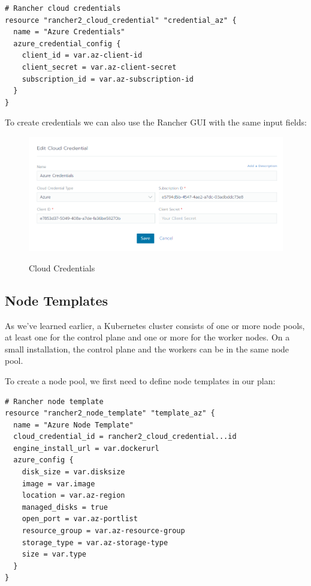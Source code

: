 \begin{lstlisting}[caption=Cloud Credentials, frame=single, basicstyle=\ttfamily]
# Rancher cloud credentials
resource "rancher2_cloud_credential" "credential_az" {
  name = "Azure Credentials"
  azure_credential_config {
    client_id = var.az-client-id
    client_secret = var.az-client-secret
    subscription_id = var.az-subscription-id
  }
}
\end{lstlisting}

To create credentials we can also use the Rancher GUI with the same input fields:

\begin{figure}[H]
\centering
\caption {Cloud Credentials}
\includegraphics[width=\linewidth]{images/cloud-credentials.png}
\label{fig:cloudCredentials}
\end{figure}

\subsection{Node Templates}

As we've learned earlier, a Kubernetes cluster consists of one or more node pools, at least one for the control plane and one or more for the worker nodes. On a small installation, the control plane and the workers can be in the same node pool.

To create a node pool, we first need to define node templates in our plan:

\begin{lstlisting}[caption=Node Template, frame=single, basicstyle=\ttfamily]
# Rancher node template
resource "rancher2_node_template" "template_az" {
  name = "Azure Node Template"
  cloud_credential_id = rancher2_cloud_credential...id
  engine_install_url = var.dockerurl
  azure_config {
    disk_size = var.disksize
    image = var.image
    location = var.az-region
    managed_disks = true
    open_port = var.az-portlist
    resource_group = var.az-resource-group
    storage_type = var.az-storage-type
    size = var.type
  }
}
\end{lstlisting}

